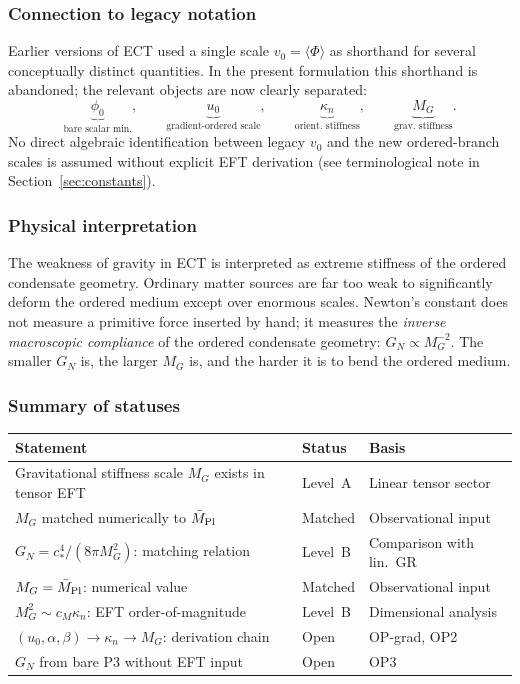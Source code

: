 \documentclass[11pt,a4paper]{article}
\numberwithin{equation}{section}
\begin{document}
\subsubsection*{Connection to legacy notation}

Earlier versions of ECT used a single scale $v_0=\langle\Phi\rangle$
as shorthand for several conceptually distinct quantities.
In the present formulation this shorthand is abandoned; the relevant
objects are now clearly separated:
\begin{equation}
  \label{eq:scale_separation}
  \underbrace{\phi_0}_{\text{bare scalar min.}},
  \qquad
  \underbrace{u_0}_{\text{gradient-ordered scale}},
  \qquad
  \underbrace{\kappa_n}_{\text{orient.\ stiffness}},
  \qquad
  \underbrace{M_G}_{\text{grav.\ stiffness}}.
\end{equation}
No direct algebraic identification between legacy $v_0$ and the
new ordered-branch scales is assumed without explicit EFT derivation
(see terminological note in Section~\ref{sec:constants}).

\subsubsection*{Physical interpretation}

The weakness of gravity in ECT is interpreted as extreme stiffness of
the ordered condensate geometry.
Ordinary matter sources are far too weak to significantly deform the
ordered medium except over enormous scales.
Newton's constant does not measure a primitive force inserted by hand;
it measures the \emph{inverse macroscopic compliance} of the ordered
condensate geometry:
$G_N\propto M_G^{-2}$.
The smaller $G_N$ is, the larger $M_G$ is, and the harder it is to
bend the ordered medium.

\subsubsection*{Summary of statuses}

\begin{center}
\renewcommand{\arraystretch}{1.4}\small
\begin{tabular}{p{6.8cm}p{2.5cm}p{2.5cm}}
\hline\hline
Statement & Status & Basis \\
\hline
Gravitational stiffness scale $M_G$ exists in tensor EFT
  & Level~A & Linear tensor sector \\
$M_G$ matched numerically to $\bar M_{\rm Pl}$
  & Matched & Observational input \\
$G_N=c_*^4/(8\pi M_G^2)$: matching relation
  & Level~B & Comparison with lin.\ GR \\
$M_G=\bar M_{\rm Pl}$: numerical value
  & Matched & Observational input \\
$M_G^2\sim c_M\kappa_n$: EFT order-of-magnitude
  & Level~B & Dimensional analysis \\
$(u_0,\alpha,\beta)\to\kappa_n\to M_G$: derivation chain
  & Open & OP-grad, OP2 \\
$G_N$ from bare P3 without EFT input
  & Open & OP3 \\
\hline\hline
\end{tabular}
\end{center}
\end{document}
